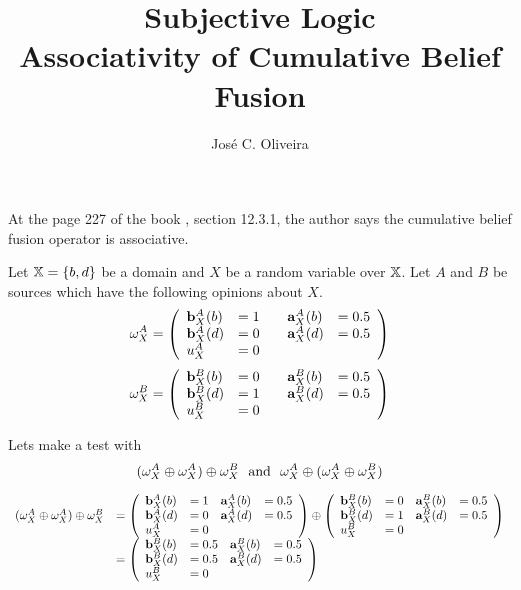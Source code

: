 \documentclass[a4paper,12pt]{article}
\title{Subjective Logic\\
\large{Associativity of Cumulative Belief Fusion}}
\author{José C. Oliveira}
\theoremstyle{definition}
\theoremstyle{theorem}
\numberwithin{equation}{section}
\begin{document}
\maketitle

At the page 227 of the book \cite{josang2016subjective}, section 12.3.1, the author says the cumulative belief fusion operator is associative.

Let $\mathbb{X} = \{b, d\}$ be a domain and $X$ be a random variable over $\mathbb{X}$. Let $A$ and $B$ be sources which have the following opinions about $X$.
\begin{equation}
\omega^{A}_{X} = \left(
\begin{array}{lllll}
\mathbf{b}^{A}_{X}(b) & = 1 & & \mathbf{a}^{A}_{X}(b) & = 0.5 \\
\mathbf{b}^{A}_{X}(d) & = 0 & & \mathbf{a}^{A}_{X}(d) & = 0.5 \\
u^A_X & = 0
\end{array}
\right)
\end{equation}
\begin{equation}
\omega^{B}_{X} = \left(
\begin{array}{lllll}
\mathbf{b}^{B}_{X}(b) & = 0 & & \mathbf{a}^{B}_{X}(b) & = 0.5 \\
\mathbf{b}^{B}_{X}(d) & = 1 & & \mathbf{a}^{B}_{X}(d) & = 0.5 \\
u^B_X & = 0
\end{array}
\right)
\end{equation}

Lets make a test with
\begin{equation}
(\omega^{A}_{X} \oplus \omega^{A}_{X}) \oplus \omega^{B}_{X}\ \text{ and }\ \omega^{A}_{X} \oplus (\omega^{A}_{X} \oplus \omega^{B}_{X})
\end{equation}

\begin{equation}
\begin{array} {rl}
(\omega^{A}_{X} \oplus \omega^{A}_{X}) \oplus \omega^{B}_{X} & = \left(
\begin{array}{llll}
\mathbf{b}^{A}_{X}(b) & = 1 & \mathbf{a}^{A}_{X}(b) & = 0.5 \\
\mathbf{b}^{A}_{X}(d) & = 0 & \mathbf{a}^{A}_{X}(d) & = 0.5 \\
u^A_X & = 0
\end{array} \right) \oplus \left(
\begin{array}{llll}
\mathbf{b}^{B}_{X}(b) & = 0 & \mathbf{a}^{B}_{X}(b) & = 0.5 \\
\mathbf{b}^{B}_{X}(d) & = 1 & \mathbf{a}^{B}_{X}(d) & = 0.5 \\
u^B_X & = 0
\end{array} \right) \\
& = \left(
\begin{array}{llll}
\mathbf{b}^{B}_{X}(b) & = 0.5 & \mathbf{a}^{B}_{X}(b) & = 0.5 \\
\mathbf{b}^{B}_{X}(d) & = 0.5 & \mathbf{a}^{B}_{X}(d) & = 0.5 \\
u^B_X & = 0
\end{array} \right)
\end{array}
\end{equation}
\end{document}
